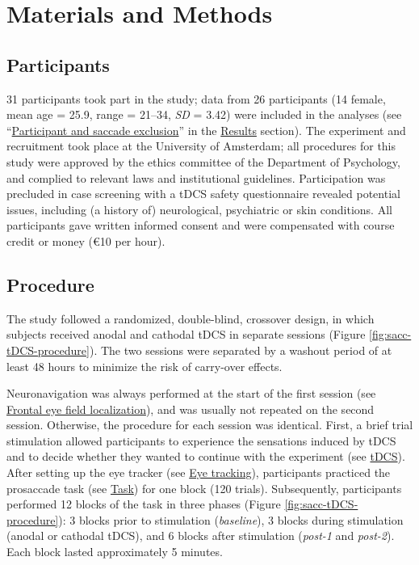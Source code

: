 \documentclass[11pt,english,]{memoir}
\begin{document}
\hypertarget{sacc_tDCS-methods}{%
\section{Materials and Methods}\label{sacc_tDCS-methods}}

\hypertarget{participants}{%
\subsection{Participants}\label{participants}}

31 participants took part in the study; data from 26 participants (14 female, mean age = 25.9, range = 21--34, \emph{SD} = 3.42) were included in the analyses (see ``\protect\hyperlink{participant-and-saccade-exclusion}{Participant and saccade exclusion}'' in the \protect\hyperlink{sacc_tDCS-results}{Results} section). The experiment and recruitment took place at the University of Amsterdam; all procedures for this study were approved by the ethics committee of the Department of Psychology, and complied to relevant laws and institutional guidelines. Participation was precluded in case screening with a tDCS safety questionnaire revealed potential issues, including (a history of) neurological, psychiatric or skin conditions. All participants gave written informed consent and were compensated with course credit or money (€10 per hour).

\hypertarget{procedure}{%
\subsection{Procedure}\label{procedure}}

The study followed a randomized, double-blind, crossover design, in which subjects received anodal and cathodal tDCS in separate sessions (Figure \ref{fig:sacc-tDCS-procedure}). The two sessions were separated by a washout period of at least 48 hours to minimize the risk of carry-over effects.

Neuronavigation was always performed at the start of the first session (see \protect\hyperlink{frontal-eye-field-localization}{Frontal eye field localization}), and was usually not repeated on the second session. Otherwise, the procedure for each session was identical. First, a brief trial stimulation allowed participants to experience the sensations induced by tDCS and to decide whether they wanted to continue with the experiment (see \protect\hyperlink{sacc-methods-tDCS}{tDCS}). After setting up the eye tracker (see \protect\hyperlink{eye-tracking}{Eye tracking}), participants practiced the prosaccade task (see \protect\hyperlink{sacc-task}{Task}) for one block (120 trials). Subsequently, participants performed 12 blocks of the task in three phases (Figure \ref{fig:sacc-tDCS-procedure}): 3 blocks prior to stimulation (\emph{baseline}), 3 blocks during stimulation (anodal or cathodal tDCS), and 6 blocks after stimulation (\emph{post-1} and \emph{post-2}). Each block lasted approximately 5 minutes.
\end{document}
